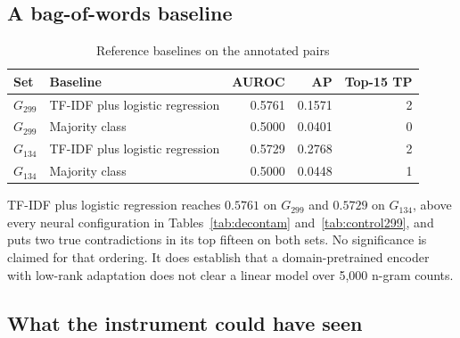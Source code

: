\subsection{A bag-of-words baseline}

\begin{table}[H]
\caption{Reference baselines on the annotated pairs}
\centering
\small
\begin{tabular}{llrrr}
\toprule
\textbf{Set} & \textbf{Baseline} & \textbf{AUROC} & \textbf{AP} &
\textbf{Top-15 TP} \\
\midrule
$G_{299}$ & TF-IDF plus logistic regression & 0.5761 & 0.1571 & 2 \\
$G_{299}$ & Majority class                  & 0.5000 & 0.0401 & 0 \\
$G_{134}$ & TF-IDF plus logistic regression & 0.5729 & 0.2768 & 2 \\
$G_{134}$ & Majority class                  & 0.5000 & 0.0448 & 1 \\
\bottomrule
\end{tabular}
\label{tab:baselines}
\end{table}

TF-IDF plus logistic regression reaches $0.5761$ on $G_{299}$ and $0.5729$ on
$G_{134}$, above every neural configuration in Tables~\ref{tab:decontam}
and~\ref{tab:control299}, and puts two true contradictions in its top fifteen on
both sets. No significance is claimed for that ordering. It does establish that a
domain-pretrained encoder \citep{gu2021biomedbert} with low-rank adaptation
\citep{hu2022lora} does not clear a linear model over 5,000 n-gram counts.

\subsection{What the instrument could have seen}

